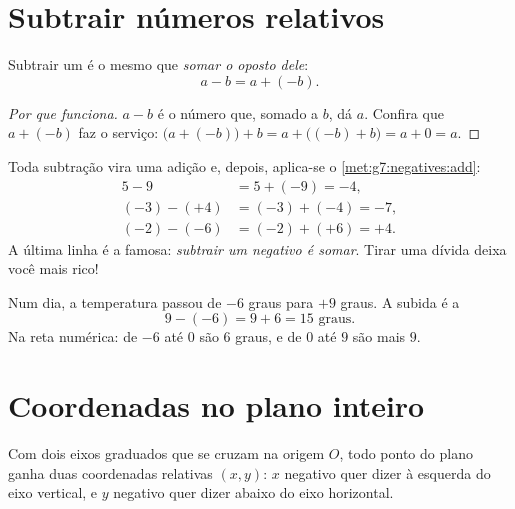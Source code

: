 \section{Subtrair números relativos}

\begin{theorem}\label{thm:g7:negatives:sub}
Subtrair um  é o mesmo que \emph{somar o oposto dele}:
\[
a - b = a + (-b) .
\]
\end{theorem}

\begin{proof}[Por que funciona]
$a - b$ é o número que, somado a $b$, dá $a$. Confira que $a + (-b)$
faz o serviço:
$\bigl(a + (-b)\bigr) + b = a + \bigl((-b) + b\bigr) = a + 0 = a$.
\end{proof}

\begin{example}\label{ex:g7:negatives:sub}
Toda subtração vira uma adição e, depois, aplica-se o
\cref{met:g7:negatives:add}:
\begin{align*}
5 - 9 &= 5 + (-9) = -4, \\
(-3) - (+4) &= (-3) + (-4) = -7, \\
(-2) - (-6) &= (-2) + (+6) = +4 .
\end{align*}
A última linha é a famosa: \emph{subtrair um negativo é somar}. Tirar
uma dívida deixa você mais rico!
\end{example}

\begin{example}\label{ex:g7:negatives:temperature}
Num dia, a temperatura passou de $-6$ graus para $+9$ graus. A subida é
a 
\[
9 - (-6) = 9 + 6 = 15 \text{ graus}.
\]
Na reta numérica: de $-6$ até $0$ são $6$ graus, e de $0$ até $9$ são
mais $9$.
\end{example}

\section{Coordenadas no plano inteiro}

\begin{definition}\label{def:g7:negatives:coords}
Com dois eixos graduados  que se cruzam na origem $O$,
todo ponto do plano ganha duas coordenadas relativas $(x, y)$: $x$
negativo quer dizer à esquerda do eixo vertical, e $y$ negativo quer
dizer abaixo do eixo horizontal.
\end{definition}

